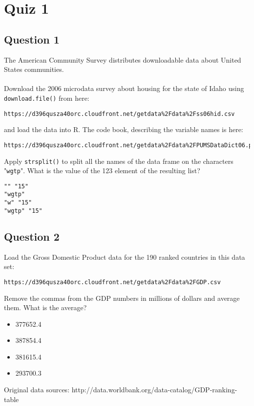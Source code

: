 \documentclass[]{article}
\begin{document}
\section*{Quiz 1}

\subsection*{Question 1}
The American Community Survey distributes downloadable data about United States communities. \\ \\ Download the 2006 microdata survey about housing for the state of Idaho using \texttt{download.file()} from here: 

\begin{verbatim}
https://d396qusza40orc.cloudfront.net/getdata%2Fdata%2Fss06hid.csv 
\end{verbatim}
and load the data into R. The code book, describing the variable names is here: 
\begin{verbatim}
https://d396qusza40orc.cloudfront.net/getdata%2Fdata%2FPUMSDataDict06.pdf 
\end{verbatim}
Apply \texttt{strsplit()} to split all the names of the data frame on the characters "\texttt{wgtp}". What is the value of the 123 element of the resulting list?
\begin{verbatim}
"" "15"
"wgtp"
"w" "15"
"wgtp" "15"
\end{verbatim}
\newpage
\subsection*{Question 2}
Load the Gross Domestic Product data for the 190 ranked countries in this data set: 

\begin{verbatim}
https://d396qusza40orc.cloudfront.net/getdata%2Fdata%2FGDP.csv 
\end{verbatim}
Remove the commas from the GDP numbers in millions of dollars and average them. What is the average? 

\begin{itemize}
\item 377652.4
\item 387854.4
\item 381615.4
\item 293700.3
\end{itemize}

Original data sources: http://data.worldbank.org/data-catalog/GDP-ranking-table
\newpage
\end{document}
